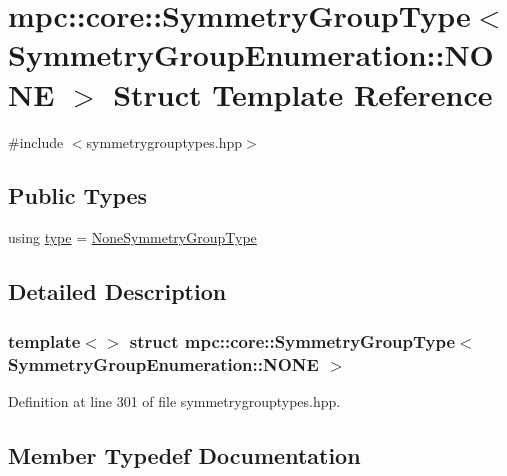 \hypertarget{structmpc_1_1core_1_1_symmetry_group_type_3_01_symmetry_group_enumeration_1_1_n_o_n_e_01_4}{}\section{mpc\+:\+:core\+:\+:Symmetry\+Group\+Type$<$ Symmetry\+Group\+Enumeration\+:\+:N\+O\+NE $>$ Struct Template Reference}
\label{structmpc_1_1core_1_1_symmetry_group_type_3_01_symmetry_group_enumeration_1_1_n_o_n_e_01_4}


{\ttfamily \#include $<$symmetrygrouptypes.\+hpp$>$}

\subsection*{Public Types}
\begin{DoxyCompactItemize}
\item 
using \mbox{\hyperlink{structmpc_1_1core_1_1_symmetry_group_type_3_01_symmetry_group_enumeration_1_1_n_o_n_e_01_4_a502f9bba4f27dfdb37eb97b82c48545a}{type}} = \mbox{\hyperlink{structmpc_1_1core_1_1_none_symmetry_group_type}{None\+Symmetry\+Group\+Type}}
\end{DoxyCompactItemize}


\subsection{Detailed Description}
\subsubsection*{template$<$$>$\newline
struct mpc\+::core\+::\+Symmetry\+Group\+Type$<$ Symmetry\+Group\+Enumeration\+::\+N\+O\+N\+E $>$}



Definition at line 301 of file symmetrygrouptypes.\+hpp.



\subsection{Member Typedef Documentation}
\mbox{\label{structmpc_1_1core_1_1_symmetry_group_type_3_01_symmetry_group_enumeration_1_1_n_o_n_e_01_4_a502f9bba4f27dfdb37eb97b82c48545a}} 
